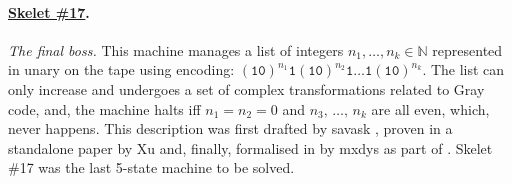 \vspace{-0.5em}
\paragraph{\href{https://bbchallenge.org/1RB---_0LC1RE_0LD1LC_1RA1LB_0RB0RA}{Skelet \#17}.} \textit{The final boss.} This machine manages a list of integers $n_1, \dots, n_k \in \mathbb{N}$ represented in unary on the tape using encoding: $(\texttt{10})^{n_1} \texttt{1} (\texttt{10})^{n_2} \texttt{1} \dots \texttt{1} (\texttt{10})^{n_k}$. The list can only increase and undergoes a set of complex transformations related to Gray code, and, the machine halts iff $n_1 = n_2 = 0$ and $n_3,\, \dots,\, n_k$ are all even, which, never happens. This description was first drafted by savask \cite{savaskSk17}, proven in a standalone paper by Xu \cite{xu2024skelet17fifthbusy} and, finally, formalised in \Coq by mxdys as part of \CoqBB. Skelet \#17 was the last 5-state machine to be solved.
